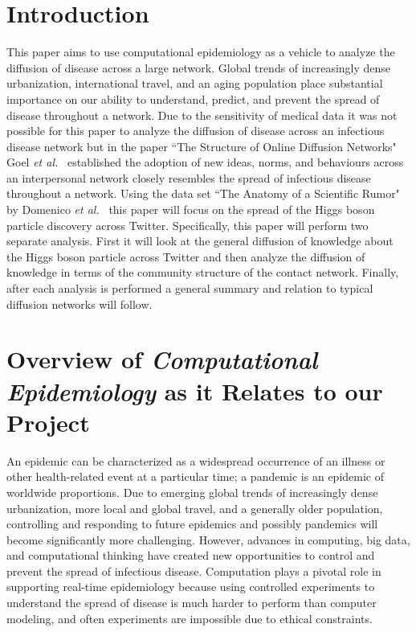 \documentclass[12pt, oneside, openany]{article} %
\begin{document}

\tableofcontents
\newpage

\section{Introduction}
This paper aims to use computational epidemiology as a vehicle to analyze the diffusion of disease across a large network. Global trends of increasingly dense urbanization, international travel, and an aging population place substantial importance on our ability to understand, predict, and prevent the spread of disease throughout a network. Due to the sensitivity of medical data it was not possible for this paper to analyze the diffusion of disease across an infectious disease network but in the paper ``The Structure of Online Diffusion Networks" Goel \emph{et al.}~\cite{goel} established the adoption of new ideas, norms, and behaviours across an interpersonal network closely resembles the spread of infectious disease throughout a network. Using the data set ``The Anatomy of a Scientific Rumor" by Domenico \emph{et al.}~\cite{domenico} this paper will focus on the spread of the Higgs boson particle discovery across Twitter. Specifically, this paper will perform two separate analysis. First it will look at the general diffusion of knowledge about the Higgs boson particle across Twitter and then analyze the diffusion of knowledge in terms of the community structure of the contact network. Finally, after each analysis is performed a general summary and relation to typical diffusion networks will follow.

\section{Overview of \textit{Computational Epidemiology} as it Relates to our Project}
An epidemic can be characterized as a widespread occurrence of an illness or other health-related event at a particular time; a pandemic is an epidemic of worldwide proportions. Due to emerging global trends of increasingly dense urbanization, more local and global travel, and a generally older population, controlling and responding to future epidemics and possibly pandemics will become significantly more challenging. However, advances in computing, big data, and computational thinking have created new opportunities to control and prevent the spread of infectious disease. Computation plays a pivotal role in supporting real-time epidemiology because using controlled experiments to understand the spread of disease is much harder to perform than computer modeling, and often experiments are impossible due to ethical constraints. 
\end{document}
